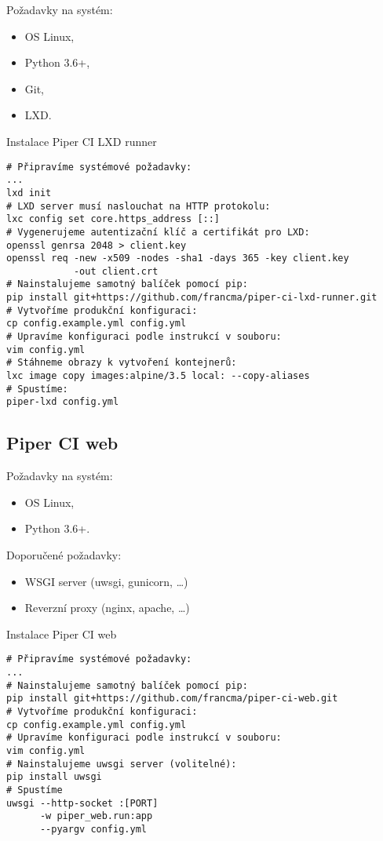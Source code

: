 Požadavky na systém:

\begin{itemize}
	\item OS Linux,
	\item Python 3.6+,
	\item Git,
	\item LXD.
\end{itemize}

\begin{listing}[H]
\caption{Instalace Piper CI LXD runner}
\begin{verbatim}
# Připravíme systémové požadavky:
...
lxd init
# LXD server musí naslouchat na HTTP protokolu:
lxc config set core.https_address [::]
# Vygenerujeme autentizační klíč a certifikát pro LXD:
openssl genrsa 2048 > client.key
openssl req -new -x509 -nodes -sha1 -days 365 -key client.key 
            -out client.crt
# Nainstalujeme samotný balíček pomocí pip:
pip install git+https://github.com/francma/piper-ci-lxd-runner.git
# Vytvoříme produkční konfiguraci:
cp config.example.yml config.yml
# Upravíme konfiguraci podle instrukcí v souboru:
vim config.yml
# Stáhneme obrazy k vytvoření kontejnerů:
lxc image copy images:alpine/3.5 local: --copy-aliases
# Spustíme:
piper-lxd config.yml
\end{verbatim}
\end{listing}


\subsection{Piper CI web}

Požadavky na systém:

\begin{itemize}
	\item OS Linux,
	\item Python 3.6+.
\end{itemize}

Doporučené požadavky:

\begin{itemize}
	\item WSGI server (uwsgi, gunicorn, \ldots)
	\item Reverzní proxy (nginx, apache, \ldots)
\end{itemize}

\begin{listing}[H]
\caption{Instalace Piper CI web}
\begin{verbatim}
# Připravíme systémové požadavky:
...
# Nainstalujeme samotný balíček pomocí pip:
pip install git+https://github.com/francma/piper-ci-web.git
# Vytvoříme produkční konfiguraci:
cp config.example.yml config.yml
# Upravíme konfiguraci podle instrukcí v souboru:
vim config.yml
# Nainstalujeme uwsgi server (volitelné):
pip install uwsgi
# Spustíme
uwsgi --http-socket :[PORT] 
      -w piper_web.run:app
      --pyargv config.yml
\end{verbatim}
\end{listing}